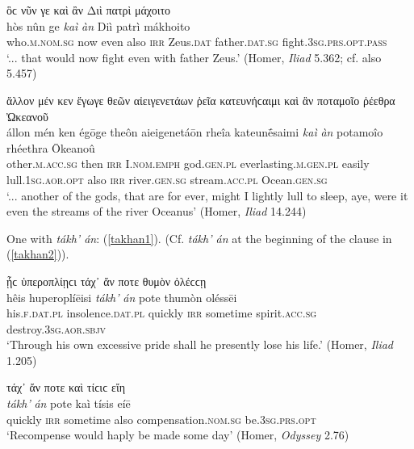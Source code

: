 \begin{exe}
\ex ὃϲ νῦν γε καὶ ἂν Διὶ πατρὶ μάχοιτο\\
\gll hòs nûn ge \emph{kaì} \emph{àn} Diì patrì mákhoito\\
who.\textsc{m.nom.sg} now even also \textsc{irr} Zeus.\textsc{dat} father.\textsc{dat.sg} fight.\textsc{3sg.prs.opt.pass}\\
\trans `... that would now fight even with father Zeus.' (Homer, \textit{Iliad} 5.362; cf. also 5.457)
\label{kaian1}
\end{exe}

\begin{exe}
\ex ἄλλον μέν κεν ἔγωγε θεῶν αἰειγενετάων ῥεῖα κατευνήϲαιμι καὶ ἂν ποταμοῖο ῥέεθρα Ὠκεανοῦ\\
\gll állon mén ken égōge theôn aieigenetáōn rheîa kateunḗsaimi \emph{kaì} \emph{àn} potamoîo rhéethra Ōkeanoû\\
other.\textsc{m.acc.sg} then \textsc{irr} I.\textsc{nom.emph} god.\textsc{gen.pl} everlasting.\textsc{m.gen.pl} easily lull.\textsc{1sg.aor.opt} also \textsc{irr} river.\textsc{gen.sg}
stream.\textsc{acc.pl} Ocean.\textsc{gen.sg}\\
\trans `... another of the gods, that are for ever, might I lightly lull to sleep, aye, were it even the streams of the river Oceanus' (Homer, \textit{Iliad} 14.244)
\label{kaian2}
\end{exe}

One with \textit{tákh' án}: (\ref{takhan1}). (Cf. \textit{tákh' án} at the beginning of the clause in (\ref{takhan2})).

\begin{exe}
\ex ᾗϲ ὑπεροπλίῃϲι τάχ᾽ ἄν ποτε θυμὸν ὀλέϲϲῃ\\
\gll hêis huperoplíēisi \emph{tákh'} \emph{án} pote thumòn oléssēi\\
his.\textsc{f.dat.pl} insolence.\textsc{dat.pl} quickly \textsc{irr} sometime spirit.\textsc{acc.sg} destroy.\textsc{3sg.aor.sbjv}\\
\trans `Through his own excessive pride shall he presently lose his life.' (Homer, \textit{Iliad} 1.205)
\label{takhan1}
\end{exe}

\begin{exe}
\ex τάχ᾽ ἄν ποτε καὶ τίϲιϲ εἴη\\
\gll \emph{tákh'} \emph{án} pote kaì tísis eíē\\
quickly \textsc{irr} sometime also compensation.\textsc{nom.sg}
be.\textsc{3sg.prs.opt}\\
\trans `Recompense would haply be made some day' (Homer, \textit{Odyssey} 2.76)
\label{takhan2}
\end{exe}

